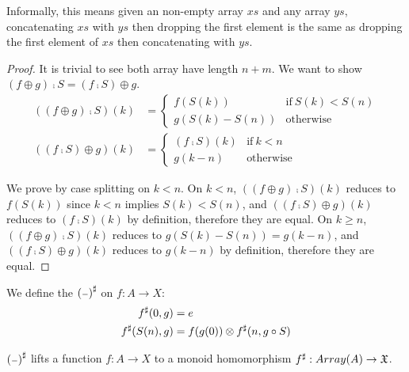 Informally, this means given an non-empty array $xs$ and any array $ys$,
concatenating $xs$ with $ys$ then dropping the first element is the same as
dropping the first element of $xs$ then concatenating with $ys$.

\begin{proof}
It is trivial to see both array have length $n + m$. We want to show $(f \oplus g) \comp S = (f \comp S) \oplus g$.
\begin{align*}
   ((f \oplus g) \comp S)(k) & = \begin{cases}
       f(S(k)) & \text{if}\ S(k) < S(n) \\
       g(S(k) - S(n)) & \text{otherwise}
   \end{cases} \\
   ((f \comp S) \oplus g)(k) & = \begin{cases}
       (f \comp S)(k) & \text{if}\ k < n \\
       g(k - n) & \text{otherwise}
   \end{cases}
\end{align*}

We prove by case splitting on $k < n$.
On $k < n$, $((f \oplus g) \comp S)(k)$ reduces to $f(S(k))$ since $k < n$ implies $S(k) < S(n)$,
and $((f \comp S) \oplus g)(k)$ reduces to $(f \comp S)(k)$ by definition, therefore they are equal.
On $k \geq n$, $((f \oplus g) \comp S)(k)$ reduces to $g(S(k) - S(n)) = g(k - n)$,
and $((f \comp S) \oplus g)(k)$ reduces to $g(k - n)$ by definition, therefore they are equal.
\end{proof}

\begin{definition}
We define the ${({\scriptstyle{-}})}^{\sharp}$ on $f : A \to X$:
\begin{align*}
    {f}^{\sharp}(0 , g) & = e \\
    {f}^{\sharp}(S(n) , g) & = f(g(0)) \otimes {f}^{\sharp}(n , g \circ S)
\end{align*} 
\end{definition}

\begin{proposition}
    ${({\scriptstyle{-}})}^{\sharp}$ lifts a function $f : A \to X$ to a monoid homomorphism ${f}^{\sharp} : Array(A) \to \mathfrak{X}$.
\end{proposition}

